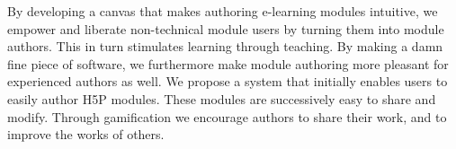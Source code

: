 By developing a canvas that makes authoring e-learning modules intuitive, we 
empower and liberate non-technical module users by turning them into module 
authors. This in turn stimulates learning through teaching. By making a damn 
fine piece of software, we furthermore make module authoring more pleasant for 
experienced authors as well. We propose a system that initially enables users 
to easily author H5P modules. These modules are successively easy to share and 
modify. Through gamification we encourage authors to share their work, and to 
improve the works of others.
